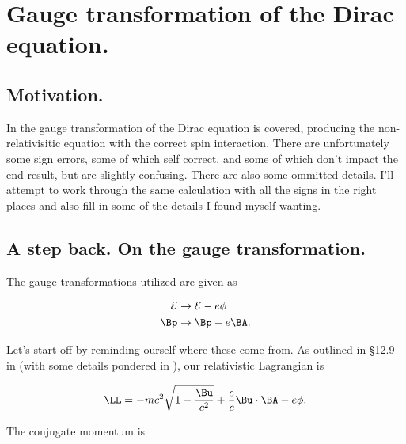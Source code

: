 
%

\newcommand{\pslash}[0]{\cancel{p}}

\chapter{Gauge transformation of the Dirac equation.}
\label{chap:diracGauge}
{}
\date{Aug 4, 2011}

\beginArtWithToc

\section{Motivation.}

In \cite{desai2009quantum} the gauge transformation of the Dirac equation is covered, producing the non-relativisitic equation with the correct spin interaction.  There are unfortunately some sign errors, some of which self correct, and some of which don't impact the end result, but are slightly confusing.  There are also some ommitted details.  I'll attempt to work through the same calculation with all the signs in the right places and also fill in some of the details I found myself wanting.

\section{A step back.  On the gauge transformation.}

The gauge transformations utilized are given as

\begin{align}\label{eqn:diracGauge:10}
\mathcal{E} &\rightarrow \mathcal{E} - e \phi \\
\Bp &\rightarrow \Bp - e \BA.
\end{align}

Let's start off by reminding ourself where these come from.  As outlined in \S 12.9 in \cite{jackson1975cew} (with some details pondered in \cite{miscphysics:hamiltonian}), our relativistic Lagrangian is

\begin{equation}\label{eqn:diracGauge:30}
\LL = -m c^2 \sqrt{ 1 - \frac{\Bu}{c^2}} + \frac{e}{c} \Bu \cdot \BA - e \phi.
\end{equation}

The conjugate momentum is

